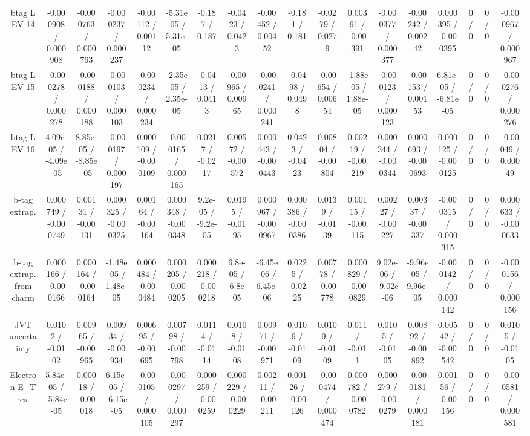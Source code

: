 \documentclass[10pt]{article}
\begin{document}
\begin{table}[htbp]
\begin{center}
\begin{tabular}{|c|c|c|c|c|c|c|c|c|c|c|c|c|c|c|c|c|c|}
  btag L EV 14 & -0.000908 / 0.000908 & -0.000763 / 0.000763 & -0.000237 / 0.000237 & -0.00112 / 0.00112 & -5.31e-05 / 5.31e-05 & -0.187 / 0.187 & -0.0423 / 0.0423 & -0.00452 / 0.00452 & -0.181 / 0.181 & -0.0279 / 0.0279 & 0.00391 / -0.00391 & -0.000377 / 0.000377 & -0.00242 / 0.00242 & 0.000395 / -0.000395 & 0 / 0 & 0 / 0 & -0.000967 / 0.000967 \\ 
  btag L EV 15 & -0.000278 / 0.000278 & -0.000188 / 0.000188 & -0.000103 / 0.000103 & -0.000234 / 0.000234 & -2.35e-05 / 2.35e-05 & -0.0413 / 0.0413 & -0.00965 / 0.00965 & -0.000241 / 0.000241 & -0.0498 / 0.0498 & -0.00654 / 0.00654 & -1.88e-05 / 1.88e-05 & -0.000123 / 0.000123 & -0.00153 / 0.00153 & 6.81e-05 / -6.81e-05 & 0 / 0 & 0 / 0 & -0.000276 / 0.000276 \\ 
  btag L EV 16 & 4.09e-05 / -4.09e-05 & 8.85e-05 / -8.85e-05 & -0.000197 / 0.000197 & 0.000109 / -0.000109 & -0.000165 / 0.000165 & 0.0217 / -0.0217 & 0.00572 / -0.00572 & 0.000443 / -0.000443 & 0.0423 / -0.0423 & 0.00804 / -0.00804 & 0.00219 / -0.00219 & 0.000344 / -0.000344 & 0.000693 / -0.000693 & 0.000125 / -0.000125 & 0 / 0 & 0 / 0 & -0.00049 / 0.00049 \\ 
  b-tag extrap. & 0.000749 / -0.000749 & 0.00131 / -0.00131 & 0.000325 / -0.000325 & 0.00164 / -0.00164 & 0.000348 / -0.000348 & 9.2e-05 / -9.2e-05 & 0.0195 / -0.0195 & 0.000967 / -0.000967 & 0.000386 / -0.000386 & 0.0139 / -0.0139 & 0.00115 / -0.00115 & 0.00227 / -0.00227 & 0.00337 / -0.00337 & -0.000315 / 0.000315 & 0 / 0 & 0 / 0 & 0.000633 / -0.000633 \\ 
  b-tag extrap. from charm & 0.000166 / -0.000166 & 0.000164 / -0.000164 & -1.48e-05 / 1.48e-05 & 0.000484 / -0.000484 & 0.000205 / -0.000205 & 0.000218 / -0.000218 & 6.8e-05 / -6.8e-05 & -6.45e-06 / 6.45e-06 & 0.0225 / -0.0225 & 0.00778 / -0.00778 & 0.000829 / -0.000829 & 9.02e-06 / -9.02e-06 & -9.96e-05 / 9.96e-05 & -0.000142 / 0.000142 & 0 / 0 & 0 / 0 & -0.000156 / 0.000156 \\ 
  JVT uncertainty & 0.0102 / -0.0102 & 0.00965 / -0.00965 & 0.00934 / -0.00934 & 0.00695 / -0.00695 & 0.00798 / -0.00798 & 0.0114 / -0.0114 & 0.0108 / -0.0108 & 0.00971 / -0.00971 & 0.0109 / -0.0109 & 0.0109 / -0.0109 & 0.011 / -0.011 & 0.0105 / -0.0105 & 0.00892 / -0.00892 & 0.00542 / -0.00542 & 0 / 0 & 0 / 0 & 0.0105 / -0.0105 \\ 
  Electron E_{T} res. & 5.84e-05 / -5.84e-05 & 0.00018 / -0.00018 & 6.15e-05 / -6.15e-05 & -0.000105 / 0.000105 & -0.000297 / 0.000297 & 0.000259 / -0.000259 & 0.000229 / -0.000229 & 0.00211 / -0.00211 & 0.00126 / -0.00126 & -0.000474 / 0.000474 & 0.000782 / -0.000782 & 0.000279 / -0.000279 & -0.000181 / 0.000181 & 0.00156 / -0.00156 & 0 / 0 & 0 / 0 & -0.000581 / 0.000581 \\ 

\end{tabular}
\end{center}
\end{table}
\end{document}
